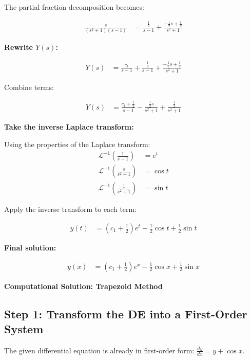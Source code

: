 \documentclass[journal]{IEEEtran}
\begin{document}
	The partial fraction decomposition becomes:
	
	\begin{align}
		\frac{s}{(s^2 + 1)(s - 1)} &= \frac{\frac{1}{2}}{s - 1} + \frac{-\frac{1}{2}s + \frac{1}{2}}{s^2 + 1}
	\end{align}
	
	\textbf{Rewrite $Y(s)$:}
	
	\begin{align}
		Y(s) &= \frac{c_1}{s - 1} + \frac{\frac{1}{2}}{s - 1} + \frac{-\frac{1}{2}s + \frac{1}{2}}{s^2 + 1}
	\end{align}
	
	Combine terms:
	
	\begin{align}
		Y(s) &= \frac{c_1 + \frac{1}{2}}{s - 1} - \frac{\frac{1}{2}s}{s^2 + 1} + \frac{\frac{1}{2}}{s^2 + 1}
	\end{align}
	
	\textbf{Take the inverse Laplace transform:}
	
	Using the properties of the Laplace transform:
	\begin{align}
		\mathcal{L}^{-1}\left(\frac{1}{s - 1}\right) &= e^t \\
		\mathcal{L}^{-1}\left(\frac{s}{s^2 + 1}\right) &= \cos t \\
		\mathcal{L}^{-1}\left(\frac{1}{s^2 + 1}\right) &= \sin t
	\end{align}
	
	Apply the inverse transform to each term:
	
	\begin{align}
		y(t) &= \left(c_1 + \frac{1}{2}\right)e^t - \frac{1}{2}\cos t + \frac{1}{2}\sin t
	\end{align}
	
	\textbf{Final solution:}
	
	\begin{align}
		y(x) &= \left(c_1 + \frac{1}{2}\right)e^x - \frac{1}{2}\cos x + \frac{1}{2}\sin x
	\end{align}
	
	
	\textbf{Computational Solution: Trapezoid Method}
	
	\subsection*{Step 1: Transform the DE into a First-Order System}
	
	The given differential equation is already in first-order form:
	$\frac{dy}{dx} = y + \cos x$.
	
\end{document}
